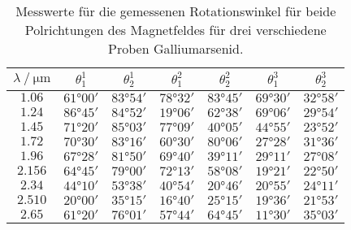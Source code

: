 \begin{table}[H]
    \centering
    \caption{Messwerte für die gemessenen Rotationswinkel für beide Polrichtungen des Magnetfeldes für drei verschiedene Proben Galliumarsenid.}
    \label{tab:Winkeldaten}
    \begin{tabular}{S[table-format=1.3] | c c |c c | c c}
    \toprule
      {$\lambda \mathbin{/} \unit{\micro\meter}$ } & {$\theta^1_1$} & {$\theta^1_2$} & {$\theta^2_1$} & {$\theta^2_2$} & {$\theta^3_1$} & {$\theta^3_2$} \\
    \midrule
    {$1.06$}    & {$61°00'$}&   {$83°54'$}&   {$78°32'$}&   {$83°45'$}&   {$69°30'$}&  {$32°58'$} \\
    {$1.24$}    & {$86°45'$}&   {$84°52'$}&   {$19°06'$}&   {$62°38'$}&   {$69°06'$}&  {$29°54'$} \\
    {$1.45$}    & {$71°20'$}&   {$85°03'$}&   {$77°09'$}&   {$40°05'$}&   {$44°55'$}&  {$23°52'$} \\
    {$1.72$}    & {$70°30'$}&   {$83°16'$}&   {$60°30'$}&   {$80°06'$}&   {$27°28'$}&  {$31°36'$} \\
    {$1.96$}    & {$67°28'$}&   {$81°50'$}&   {$69°40'$}&   {$39°11'$}&   {$29°11'$}&  {$27°08'$} \\
    {$2.156$}   & {$64°45'$}&   {$79°00'$}&   {$72°13'$}&   {$58°08'$}&   {$19°21'$}&  {$22°50'$} \\
    {$2.34$}    & {$44°10'$}&   {$53°38'$}&   {$40°54'$}&   {$20°46'$}&   {$20°55'$}&  {$24°11'$} \\
    {$2.510$}   & {$20°00'$}&   {$35°15'$}&   {$16°40'$}&   {$25°15'$}&   {$19°36'$}&  {$21°53'$} \\
    {$2.65$}    & {$61°20'$}&   {$76°01'$}&   {$57°44'$}&   {$64°45'$}&   {$11°30'$}&  {$35°03'$} \\
    \bottomrule
    \end{tabular}
\end{table}
